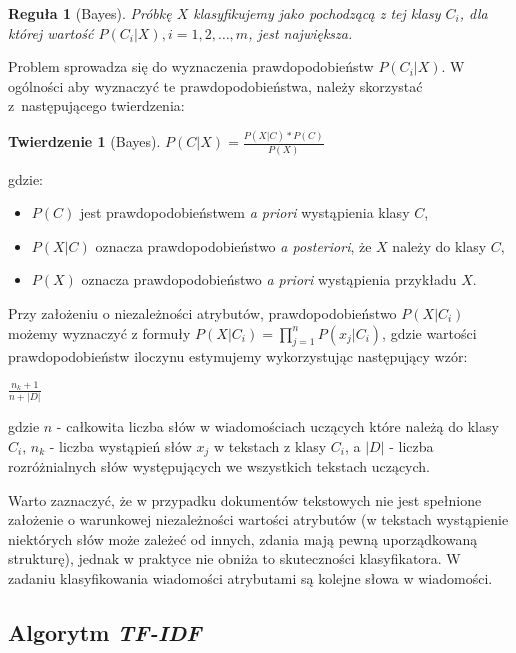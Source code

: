 \documentclass[a4paper,12pt]{article}
\newtheorem{rg}{Reguła}
\newtheorem{twr}{Twierdzenie}
\begin{document}
\begin{rg}[Bayes]
Próbkę $X$ klasyfikujemy jako pochodzącą z tej klasy $C_i$, dla której wartość $P(C_i|X), i = 1, 2, \dots, m$, jest największa.
\end{rg}
 
Problem sprowadza się do wyznaczenia prawdopodobieństw $P(C_i|X)$. W ogólności aby wyznaczyć te prawdopodobieństwa, należy skorzystać z~następującego twierdzenia:

\begin{twr}[Bayes]
$P(C|X) = \frac{P(X|C)*P(C)}{P(X)}$
\end{twr}
 
gdzie:

\begin{itemize}
\item \textbf{$P(C)$} jest prawdopodobieństwem \textit{a priori} wystąpienia klasy $C$,
\item \textbf{$P(X|C)$} oznacza prawdopodobieństwo \textit{a posteriori}, że $X$ należy do klasy $C$,
\item \textbf{$P(X)$} oznacza prawdopodobieństwo \textit{a priori} wystąpienia przykładu $X$.
\end{itemize} 
 
Przy założeniu o niezależności atrybutów, prawdopodobieństwo $P(X|C_i)$ możemy wyznaczyć z formuły $P(X|C_i) = \prod\limits_{j=1}^n P(x_j|C_i)$, gdzie wartości prawdopodobieństw iloczynu estymujemy wykorzystując następujący wzór:

\begin{center}
$\frac{n_k + 1}{n + |D|}$
\end{center}

gdzie $n$ - całkowita liczba słów w wiadomościach uczących które należą do klasy $C_i$, $n_k$ - liczba wystąpień słów $x_j$ w tekstach z klasy $C_i$, a $|D|$ - liczba rozróżnialnych słów występujących we wszystkich tekstach uczących.

Warto zaznaczyć, że w przypadku dokumentów tekstowych nie jest spełnione założenie o warunkowej niezależności wartości atrybutów (w tekstach wystąpienie niektórych słów może zależeć od innych, zdania mają pewną uporządkowaną strukturę), jednak w praktyce nie obniża to skuteczności klasyfikatora. W zadaniu klasyfikowania wiadomości atrybutami są kolejne słowa w wiadomości.\\



\subsection{Algorytm \textit{TF-IDF}}
\end{document}
